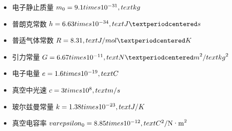 \begin{itemize}
    \item 电子静止质量 $m_0 = 9.1 \\times 10^{-31} \\, \\text{kg}$
    \item 普朗克常数 $h = 6.63 \\times 10^{-34} \\, \\text{J·s}$
    \item 普适气体常数 $R = 8.31 \\, \\text{J/mol·K}$
    \item 引力常量 $G = 6.67 \\times 10^{-11} \\, \\text{N·m}^2/\\text{kg}^2$
    \item 电子电量 $e = 1.6 \\times 10^{-19} \\, \\text{C}$
    \item 真空中光速 $c = 3 \\times 10^8 \\, \\text{m/s}$
    \item 玻尔兹曼常量 $k = 1.38 \\times 10^{-23} \\, \\text{J/K}$
    \item 真空电容率 $\\varepsilon_0 = 8.85 \\times 10^{-12} \\, \\text{C}^2/\text{N·m}^2$
\end{itemize}